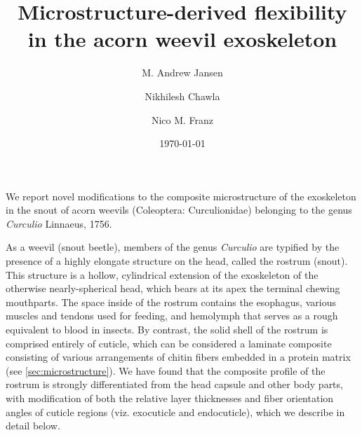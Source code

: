 \documentclass[twocolumn, linenumbers, superscriptaddress]{revtex4-1}
\begin{document}
	\begin{abstract}
		\blindtext
	\end{abstract}
	
	{\title{Microstructure-derived flexibility in the acorn weevil exoskeleton}
	
	\date{\today}
	
	\author{M. Andrew Jansen}
	\author{Nikhilesh Chawla}
	\author{Nico M. Franz}
		
	\maketitle
	}
	
	
		We report novel modifications to the composite microstructure of the exoskeleton in the snout of acorn weevils (Coleoptera: Curculionidae) belonging to the genus \textit{Curculio} Linnaeus, 1756.

		As a weevil (snout beetle), members of the genus \textit{Curculio} are typified by the presence of a highly elongate structure on the head, called the rostrum (snout). 
		This structure is a hollow, cylindrical extension of the exoskeleton of the otherwise nearly-spherical head, which bears at its apex the terminal chewing mouthparts. 
		The space inside of the rostrum contains the esophagus, various muscles and tendons used for feeding, and hemolymph that serves as a rough equivalent to blood in insects.
		By contrast, the solid shell of the rostrum is comprised entirely of cuticle, which can be considered a laminate composite consisting of various arrangements of chitin fibers embedded in a protein matrix (see \ref{sec:microstructure}).
		We have found that the composite profile of the rostrum is strongly differentiated from the head capsule and other body parts, with modification of both the relative layer thicknesses and fiber orientation angles of cuticle regions (viz. exocuticle and endocuticle), which we describe in detail below.
			
\end{document}
